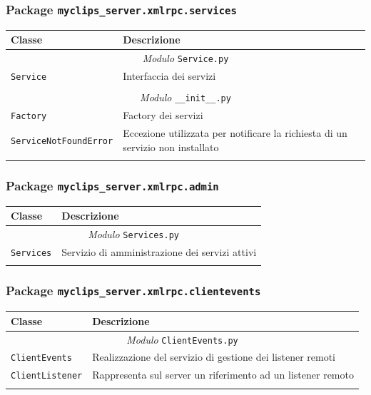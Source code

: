 \subsubsection{Package \texttt{myclips\_server.xmlrpc.services}}

\begin{longtable}{p{5.5cm}p{6.5cm}}
\hline 
\textbf{Classe} & \textbf{Descrizione} \\ 
\hline\hline 
\endhead

\multicolumn{2}{c}{\emph{Modulo} \texttt{Service.py}}\\
	\hdashline[5pt/5pt]
		\texttt{Service} & Interfaccia dei servizi \\ 
	\hline\\
	
\multicolumn{2}{c}{\emph{Modulo} \texttt{\_\_init\_\_.py}}\\
	\hdashline[5pt/5pt]
		\texttt{Factory} & Factory dei servizi \\ 
	\hdashline[1pt/5pt]
		\texttt{ServiceNotFoundError} & Eccezione utilizzata per notificare la richiesta di un servizio non installato \\ 
	\hline\\


\end{longtable}

\subsubsection{Package \texttt{myclips\_server.xmlrpc.admin}}

\begin{longtable}{p{5.5cm}p{6.5cm}}
\hline 
\textbf{Classe} & \textbf{Descrizione} \\ 
\hline\hline 
\endhead

\multicolumn{2}{c}{\emph{Modulo} \texttt{Services.py}}\\
	\hdashline[5pt/5pt]
		\texttt{Services} & Servizio di amministrazione dei servizi attivi \\ 
	\hline\\


\end{longtable}


\subsubsection{Package \texttt{myclips\_server.xmlrpc.clientevents}}

\begin{longtable}{p{5.5cm}p{6.5cm}}
\hline 
\textbf{Classe} & \textbf{Descrizione} \\ 
\hline\hline 
\endhead

\multicolumn{2}{c}{\emph{Modulo} \texttt{ClientEvents.py}}\\
	\hdashline[5pt/5pt]
		\texttt{ClientEvents} & Realizzazione del servizio di gestione dei listener remoti \\ 
	\hdashline[1pt/5pt]
		\texttt{ClientListener} & Rappresenta sul server un riferimento ad un listener remoto \\ 
	\hline\\

\end{longtable}

